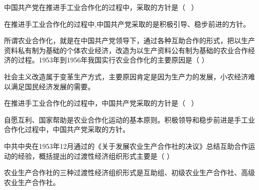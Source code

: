 \question 中国共产党在推进手工业合作化的过程中，采取的方针是（ ~）
\par{}
\begin{solution}在推进手工业合作化的过程中,中国共产党采取的是积极引导、稳步前进的方针。
\end{solution}
\question 所谓农业合作化，就是在中国共产党领导下，通过各种互助合作的形式，把以生产资料私有制为基础的个体农业经济，改造为以生产资料公有制为基础的农业合作经济的过程。1953年到1956年我国实行农业合作化的主要原因是（
）
\par{}
\begin{solution}社会主义改造属于变革生产方式，主要原因肯定是因为生产力的发展，小农经济难以满足国民经济发展的需要。
\end{solution}
\question 在推进手工业合作化的过程中，中国共产党采取的方针是（ ~）
\par{}
\begin{solution}自愿互利、国家帮助是农业合作化运动的基本原则。积极领导和稳步前进是手工业合作化过程中，中国共产党采取的方针。
\end{solution}
\question 中共中央在1953年12月通过的《关于发展农业生产合作社的决议》总结互助合作运动的经验，概括提出的过渡性经济组织形式主要是（
）
\par{}
\begin{solution}农业生产合作社的三种过渡性经济组织形式是互助组、初级农业生产合作社、高级农业生产合作社。
\end{solution}
